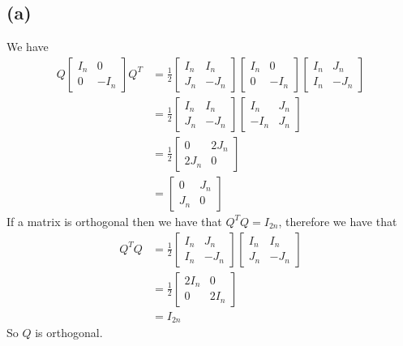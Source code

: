\subsection*{(a)}
We have
\begin{align*}
    Q\begin{bmatrix}
        I_n & 0\\
        0 & -I_n
    \end{bmatrix}Q^T&=\frac{1}{2}
    \begin{bmatrix}
        I_n & I_n\\
        J_n & -J_n
    \end{bmatrix}
    \begin{bmatrix}
        I_n & 0\\
        0 & -I_n
    \end{bmatrix}
    \begin{bmatrix}
        I_n & J_n\\
        I_n & -J_n
    \end{bmatrix}\\
    &=\frac{1}{2}
    \begin{bmatrix}
        I_n & I_n\\
        J_n & -J_n
    \end{bmatrix}
    \begin{bmatrix}
        I_n & J_n\\
        -I_n & J_n
    \end{bmatrix}\\
    &=\frac{1}{2}
    \begin{bmatrix}
        0 & 2J_n\\
        2J_n & 0
    \end{bmatrix}\\
    &=\begin{bmatrix}
        0 & J_n\\
        J_n & 0
    \end{bmatrix}
\end{align*}
If a matrix is orthogonal then we have that $Q^TQ=I_{2n}$, therefore we have that
\begin{align*}
    Q^TQ&=\frac{1}{2}\begin{bmatrix}
        I_n & J_n\\
        I_n & -J_n
    \end{bmatrix}
    \begin{bmatrix}
        I_n & I_n\\
        J_n & -J_n
    \end{bmatrix}\\
    &=\frac{1}{2}\begin{bmatrix}
        2I_n & 0\\
        0 & 2I_n
    \end{bmatrix}\\
    &=I_{2n}
\end{align*}
So $Q$ is orthogonal.
